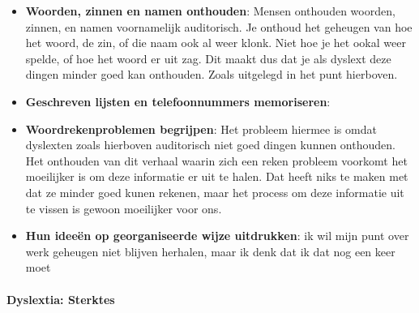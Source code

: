 \documentclass{article}
\begin{document}
\begin{itemize}
                        \item \textbf{Woorden, zinnen en namen onthouden}\cite{dyslextia-struggles-and-superpowers}:
                            Mensen onthouden woorden, zinnen, en namen voornamelijk auditorisch. Je onthoud het geheugen van hoe het woord, de zin, of die naam ook al weer klonk. Niet hoe je het ookal weer spelde, of hoe het woord er uit zag. Dit maakt dus dat je als dyslext deze dingen minder goed kan onthouden. Zoals uitgelegd in het punt hierboven.
                        \item \textbf{Geschreven lijsten en telefoonnummers memoriseren}\cite{dyslextia-struggles-and-superpowers}:
                        \item \textbf{Woordrekenproblemen begrijpen}\cite{dyslextia-struggles-and-superpowers}:
                            Het probleem hiermee is omdat dyslexten zoals hierboven auditorisch niet goed dingen kunnen onthouden. Het onthouden van dit verhaal waarin zich een reken probleem voorkomt het moeilijker is om deze informatie er uit te halen. Dat heeft niks te maken met dat ze minder goed kunen rekenen, maar het process om deze informatie uit te vissen is gewoon moeilijker voor ons.
                        \item \textbf{Hun ideeën op georganiseerde wijze uitdrukken}\cite{dyslextia-struggles-and-superpowers}:
                            ik wil mijn punt over werk geheugen niet blijven herhalen, maar ik denk dat ik dat nog een keer moet
                    \end{itemize}
                    
                \bigskip\noindent\paragraph{Dyslextia: Sterktes}
                    
\end{document}
